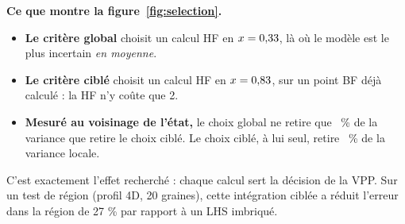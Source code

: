 \documentclass[11pt,a4paper]{article}
\begin{document}
\textbf{Ce que montre la figure~\ref{fig:selection}.}
\begin{itemize}
  \item \textbf{Le critère global} choisit un calcul HF en $x=0{,}33$, là où le modèle est le plus
        incertain \emph{en moyenne}.
  \item \textbf{Le critère ciblé} choisit un calcul HF en $x=0{,}83$, sur un point BF déjà calculé : la
        HF n'y coûte que 2.
  \item \textbf{Mesuré au voisinage de l'état,} le choix global ne retire que \valPartGlobal{}~\% de la
        variance que retire le choix ciblé. Le choix ciblé, à lui seul, retire \valReductionCible{}~\% de la
        variance locale.
\end{itemize}
C'est exactement l'effet recherché : chaque calcul sert la décision de la VPP. Sur un test de région (profil
4D, 20 graines), cette intégration ciblée a réduit l'erreur dans la région de 27 \% par rapport à un LHS
imbriqué.
\end{document}
